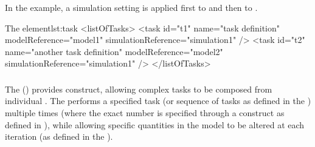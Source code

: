In the example, a simulation setting  is applied first to  and then to .
\begin{myXmlLst}{The  element}{lst:task}
<listOfTasks>
	<task id="t1" name="task definition" modelReference="model1" 
		simulationReference="simulation1" />
	<task id="t2" name="another task definition" modelReference="model2" 
		simulationReference="simulation1" />
</listOfTasks>
\end{myXmlLst}


\begin{blockChanged}



\end{blockChanged}

\subsubsection{}
\label{class:repeatedTask}
The  () provides  construct, allowing complex tasks to be composed from individual . The  performs a specified task (or sequence of tasks as defined in the \hyperref[class:listOfSubTasks]{}) multiple times (where the exact number is specified through a \Range construct as defined in \hyperref[sec:rangeAttribute]{}), while allowing specific quantities in the model  to be altered at each iteration (as defined in the \hyperref[sec:changesRepeatedTask]{}).

